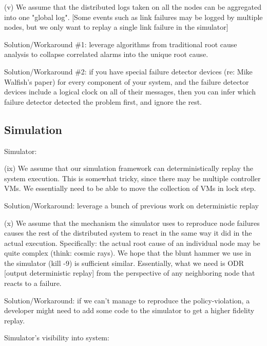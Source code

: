 (v) We assume that the distributed logs taken on all the nodes can be aggregated into one "global log". [Some events such as link failures may be logged by multiple nodes, but we only want to replay a single link failure in the simulator]

Solution/Workaround \#1: leverage algorithms from traditional root cause analysis to collapse correlated alarms into the unique root cause.

Solution/Workaround \#2: if you have special failure detector devices (re: Mike Walfish's paper) for every component of your system, and the failure detector devices include a logical clock on all of their messages, then you can infer which failure detector detected the problem first, and ignore the rest.                                                            

\subsection{Simulation}


Simulator:

(ix) We assume that our simulation framework can deterministically replay the system execution. This is somewhat tricky, since there may be multiple controller VMs. We essentially need to be able to move the collection of VMs in lock step.

Solution/Workaround: leverage a bunch of previous work on deterministic replay

(x) We assume that the mechanism the simulator uses to reproduce node failures causes the rest of the distributed system to react in the same way it did in the actual execution. Specifically: the actual root cause of an individual node may be quite complex (think: cosmic rays). We hope that the blunt hammer we use in the simulator (kill -9) is sufficient similar. Essentially, what we need is ODR [output deterministic replay] from the perspective of any neighboring node that reacts to a failure.

Solution/Workaround: if we can't manage to reproduce the policy-violation, a developer might need to add some code to the simulator to get a higher fidelity replay.

Simulator's visibility into system:

